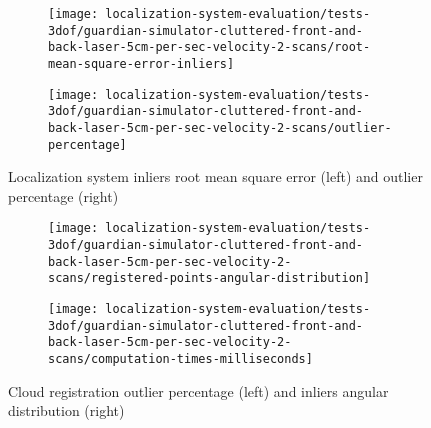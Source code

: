 \begin{figure}[ht]
	\centering
	\begin{subfigure}[h]{0.47\textwidth}
		\centering
		\texttt{[image: localization-system-evaluation/tests-3dof/guardian-simulator-cluttered-front-and-back-laser-5cm-per-sec-velocity-2-scans/root-mean-square-error-inliers]}
	\end{subfigure}
	\begin{subfigure}[h]{0.47\textwidth}
		\centering
		\texttt{[image: localization-system-evaluation/tests-3dof/guardian-simulator-cluttered-front-and-back-laser-5cm-per-sec-velocity-2-scans/outlier-percentage]}
	\end{subfigure}
	\caption{Localization system inliers root mean square error (left) and outlier percentage (right)}
	\label{fig:localization-system-evaluation_guardian-simulator-cluttered-front-and-back-laser-5cm-per-sec-velocity-2-scans_inliers-rmse-outliers-percentage}
\end{figure}

\begin{figure}[hb]
	\centering
	\begin{subfigure}[h]{0.47\textwidth}
		\centering
		\texttt{[image: localization-system-evaluation/tests-3dof/guardian-simulator-cluttered-front-and-back-laser-5cm-per-sec-velocity-2-scans/registered-points-angular-distribution]}
	\end{subfigure}
	\begin{subfigure}[h]{0.47\textwidth}
		\centering
		\texttt{[image: localization-system-evaluation/tests-3dof/guardian-simulator-cluttered-front-and-back-laser-5cm-per-sec-velocity-2-scans/computation-times-milliseconds]}
	\end{subfigure}
	\caption{Cloud registration outlier percentage (left) and inliers angular distribution (right)}
	\label{fig:localization-system-evaluation_guardian-simulator-cluttered-front-and-back-laser-5cm-per-sec-velocity-2-scans_angular-distribution-analysis-computation-time}
\end{figure}
